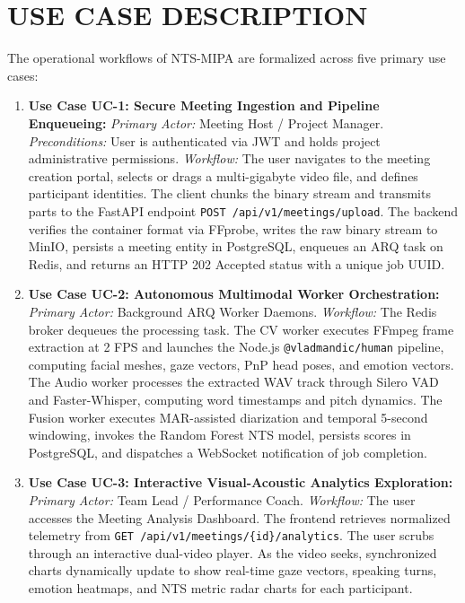 \documentclass[12pt,a4paper,oneside]{report}
\begin{document}
\section{USE CASE DESCRIPTION}
The operational workflows of NTS-MIPA are formalized across five primary use cases:
\begin{enumerate}
    \item \textbf{Use Case UC-1: Secure Meeting Ingestion and Pipeline Enqueueing:}
    \textit{Primary Actor:} Meeting Host / Project Manager.
    \textit{Preconditions:} User is authenticated via JWT and holds project administrative permissions.
    \textit{Workflow:} The user navigates to the meeting creation portal, selects or drags a multi-gigabyte video file, and defines participant identities. The client chunks the binary stream and transmits parts to the FastAPI endpoint \texttt{POST /api/v1/meetings/upload}. The backend verifies the container format via FFprobe, writes the raw binary stream to MinIO, persists a meeting entity in PostgreSQL, enqueues an ARQ task on Redis, and returns an HTTP 202 Accepted status with a unique job UUID.
    
    \item \textbf{Use Case UC-2: Autonomous Multimodal Worker Orchestration:}
    \textit{Primary Actor:} Background ARQ Worker Daemons.
    \textit{Workflow:} The Redis broker dequeues the processing task. The CV worker executes FFmpeg frame extraction at 2 FPS and launches the Node.js \texttt{@vladmandic/human} pipeline, computing facial meshes, gaze vectors, PnP head poses, and emotion vectors. The Audio worker processes the extracted WAV track through Silero VAD and Faster-Whisper, computing word timestamps and pitch dynamics. The Fusion worker executes MAR-assisted diarization and temporal 5-second windowing, invokes the Random Forest NTS model, persists scores in PostgreSQL, and dispatches a WebSocket notification of job completion.

    \item \textbf{Use Case UC-3: Interactive Visual-Acoustic Analytics Exploration:}
    \textit{Primary Actor:} Team Lead / Performance Coach.
    \textit{Workflow:} The user accesses the Meeting Analysis Dashboard. The frontend retrieves normalized telemetry from \texttt{GET /api/v1/meetings/\{id\}/analytics}. The user scrubs through an interactive dual-video player. As the video seeks, synchronized charts dynamically update to show real-time gaze vectors, speaking turns, emotion heatmaps, and NTS metric radar charts for each participant.


\end{enumerate}
\end{document}
